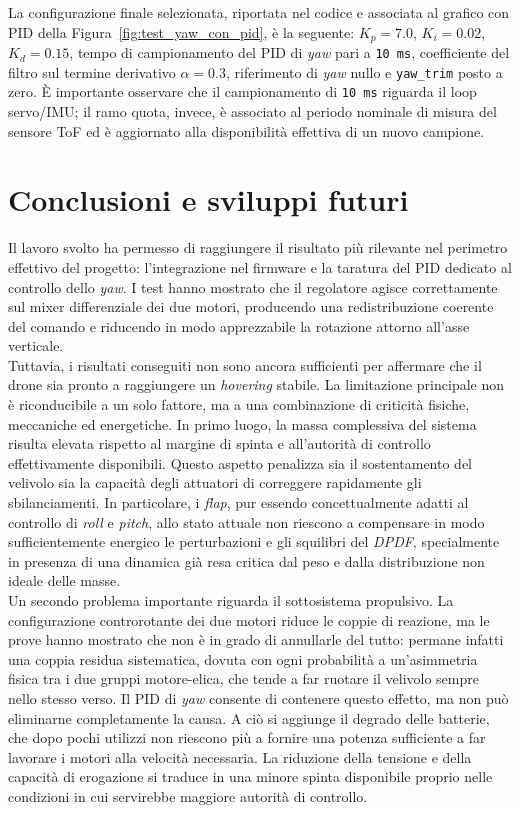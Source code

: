 \documentclass[11pt]{report}
\begin{document}
	La configurazione finale selezionata, riportata nel codice e associata al grafico con PID della Figura~\ref{fig:test_yaw_con_pid}, è la seguente: \(K_p = 7.0\), \(K_i = 0.02\), \(K_d = 0.15\), tempo di campionamento del PID di \textit{yaw} pari a \texttt{10 ms}, coefficiente del filtro sul termine derivativo \(\alpha = 0.3\), riferimento di \textit{yaw} nullo e \texttt{yaw\_trim} posto a zero. È importante osservare che il campionamento di \texttt{10 ms} riguarda il loop servo/IMU; il ramo quota, invece, è associato al periodo nominale di misura del sensore ToF ed è aggiornato alla disponibilità effettiva di un nuovo campione.
	\newpage
	\section*{Conclusioni e sviluppi futuri}
	Il lavoro svolto ha permesso di raggiungere il risultato più rilevante nel perimetro effettivo del progetto: l'integrazione nel firmware e la taratura del PID dedicato al controllo dello \textit{yaw}. I test hanno mostrato che il regolatore agisce correttamente sul mixer differenziale dei due motori, producendo una redistribuzione coerente del comando e riducendo in modo apprezzabile la rotazione attorno all'asse verticale.\\
	Tuttavia, i risultati conseguiti non sono ancora sufficienti per affermare che il drone sia pronto a raggiungere un \textit{hovering} stabile. La limitazione principale non è riconducibile a un solo fattore, ma a una combinazione di criticità fisiche, meccaniche ed energetiche. In primo luogo, la massa complessiva del sistema risulta elevata rispetto al margine di spinta e all'autorità di controllo effettivamente disponibili. Questo aspetto penalizza sia il sostentamento del velivolo sia la capacità degli attuatori di correggere rapidamente gli sbilanciamenti. In particolare, i \textit{flap}, pur essendo concettualmente adatti al controllo di \textit{roll} e \textit{pitch}, allo stato attuale non riescono a compensare in modo sufficientemente energico le perturbazioni e gli squilibri del \textit{DPDF}, specialmente in presenza di una dinamica già resa critica dal peso e dalla distribuzione non ideale delle masse.\\
	Un secondo problema importante riguarda il sottosistema propulsivo. La configurazione controrotante dei due motori riduce le coppie di reazione, ma le prove hanno mostrato che non è in grado di annullarle del tutto: permane infatti una coppia residua sistematica, dovuta con ogni probabilità a un'asimmetria fisica tra i due gruppi motore-elica, che tende a far ruotare il velivolo sempre nello stesso verso. Il PID di \textit{yaw} consente di contenere questo effetto, ma non può eliminarne completamente la causa. A ciò si aggiunge il degrado delle batterie, che dopo pochi utilizzi non riescono più a fornire una potenza sufficiente a far lavorare i motori alla velocità necessaria. La riduzione della tensione e della capacità di erogazione si traduce in una minore spinta disponibile proprio nelle condizioni in cui servirebbe maggiore autorità di controllo.\\
\end{document}
